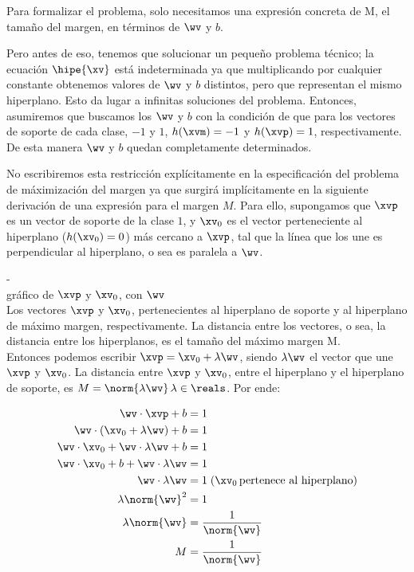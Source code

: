 Para formalizar el problema, solo necesitamos una expresión concreta de M, el tamaño del margen, en términos de $\wv$ y $b$. 

Pero antes de eso, tenemos que solucionar un pequeño problema técnico; la ecuación $\hipe{\xv}$ está indeterminada ya que multiplicando por cualquier constante obtenemos valores de $\wv$ y $b$ distintos, pero que representan el mismo hiperplano. Esto da lugar a infinitas soluciones del problema. Entonces, asumiremos que buscamos los $\wv$ y $b$ con la condición de que para los vectores de soporte de cada clase, $-1$ y $1$, $h(\xvm) =-1$ y $h(\xvp) =1$, respectivamente. De esta manera $\wv$ y $b$ quedan completamente determinados. 

No escribiremos esta restricción explícitamente en la especificación del problema de máximización del margen ya que surgirá implícitamente en la siguiente derivación de una expresión para el margen $M$. Para ello, supongamos que $\xvp$ es un vector de soporte de la clase $1$, y $\xv_0$ es el vector perteneciente al hiperplano ($h(\xv_0)=0$) más cercano a $\xvp$, tal que la línea que los une es perpendicular al hiperplano, o sea es paralela a $\wv$. 

-\\
gráfico de $\xvp$ y $\xv_0$, con $\wv$\\
Los vectores $\xvp$ y $\xv_0$, pertenecientes al hiperplano de soporte y al hiperplano de máximo margen, respectivamente. La distancia entre los vectores, o sea, la distancia entre los hiperplanos, es el tamaño del máximo margen M.\\

Entonces podemos escribir $\xvp = \xv_0 + \lambda \wv$, siendo $\lambda \wv$ el vector que une $\xvp$ y $\xv_0$. La distancia entre $\xvp$ y $\xv_0$, entre el hiperplano y el hiperplano de soporte, es $M=\norm{\lambda \wv} \, \lambda \in \reals$. Por ende:

\begin{align}
\wv \cdot \xvp + b &= 1 \\
\wv \cdot (\xv_0 + \lambda \wv) + b &= 1 \\
\wv \cdot \xv_0 + \wv \cdot \lambda \wv + b &= 1 \\
\wv \cdot \xv_0 + b + \wv \cdot \lambda \wv  &= 1 \\
\wv \cdot \lambda \wv  &= 1 \; (\xv_0 \, \text{pertenece al hiperplano}) \\
\lambda \norm{\wv}^2  &= 1  \\
\lambda \norm{\wv}  &= \frac{1}{\norm{\wv}}  \\
M &= \frac{1}{\norm{\wv}} 
\end{align}

